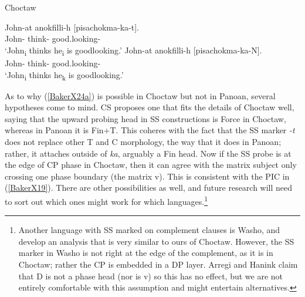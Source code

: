 \documentclass[output=paper]{langscibook}
\begin{document}
\begin{exe}
    \ex Choctaw \citep[269]{broadwell2006choctaw} \label{BakerX24}
	    \begin{xlist}
			\ex \label{BakerX24a}
			\gll John-at anokfilli-h [pisachokma-ka-t].\\
			    John- think- good.looking-\\
			    \glt `John\textsubscript{i} thinks he\textsubscript{i} is goodlooking.'
			\ex \label{BakerX24b}
			\gll John-at anokfilli-h [pisachokma-ka-N].\\
    			 John- think- good.looking-\\
			    \glt `John\textsubscript{i} thinks he\textsubscript{k} is goodlooking.'
		\end{xlist}
\end{exe}

As to why (\ref{BakerX24a}) is possible in Choctaw but not in Panoan, several hypotheses come to mind. CS proposes one that fits the details of Choctaw well, saying that the upward probing head in SS constructions is Force in Choctaw, whereas in Panoan it is Fin+T. This coheres with the fact that the SS marker \textit{-t} does not replace other T and C morphology, the way that it does in Panoan; rather, it attaches outside of \textit{ka}, arguably a Fin head. Now if the SS probe is at the edge of CP phase in Choctaw, then it can agree with the matrix subject only crossing one phase boundary (the matrix v). This is consistent with the PIC in (\ref{BakerX19}). There are other possibilities as well, and future research will need to sort out which ones might work for which languages.\footnote{Another language with SS marked on complement clauses is Washo, and \citet{arregi2019switch} develop an analysis that is very similar to ours of Choctaw. However, the SS marker in Washo is not right at the edge of the complement, as it is in Choctaw; rather the CP is embedded in a DP layer. Arregi and Hanink claim that D is not a phase head (nor is v) so this has no effect, but we are not entirely comfortable with this assumption and might entertain alternatives.}
\end{document}
